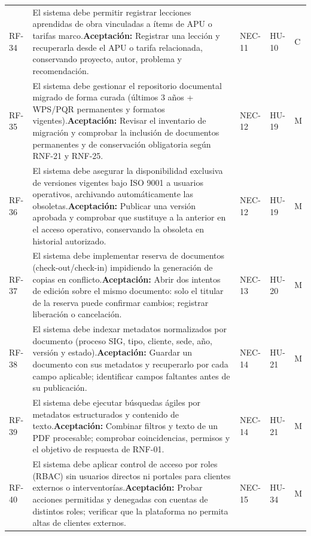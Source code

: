 \documentclass[12pt,letterpaper]{article}
\begin{document}
{\begin{longtable}{@{}L{1.6cm}L{8.05cm}L{2.0cm}L{1.5cm}L{1.2cm}@{}}
RF-34 & El sistema debe permitir registrar lecciones aprendidas de obra vinculadas a ítems de APU o tarifas marco.\newline \textbf{Aceptación:} Registrar una lección y recuperarla desde el APU o tarifa relacionada, conservando proyecto, autor, problema y recomendación. & NEC-11 & HU-10 & C\\
RF-35 & El sistema debe gestionar el repositorio documental migrado de forma curada (últimos 3 años + WPS/PQR permanentes y formatos vigentes).\newline \textbf{Aceptación:} Revisar el inventario de migración y comprobar la inclusión de documentos permanentes y de conservación obligatoria según RNF-21 y RNF-25. & NEC-12 & HU-19 & M\\
RF-36 & El sistema debe asegurar la disponibilidad exclusiva de versiones vigentes bajo ISO 9001 a usuarios operativos, archivando automáticamente las obsoletas.\newline \textbf{Aceptación:} Publicar una versión aprobada y comprobar que sustituye a la anterior en el acceso operativo, conservando la obsoleta en historial autorizado. & NEC-12 & HU-19 & M\\
RF-37 & El sistema debe implementar reserva de documentos (check-out/check-in) impidiendo la generación de copias en conflicto.\newline \textbf{Aceptación:} Abrir dos intentos de edición sobre el mismo documento: solo el titular de la reserva puede confirmar cambios; registrar liberación o cancelación. & NEC-13 & HU-20 & M\\
RF-38 & El sistema debe indexar metadatos normalizados por documento (proceso SIG, tipo, cliente, sede, año, versión y estado).\newline \textbf{Aceptación:} Guardar un documento con sus metadatos y recuperarlo por cada campo aplicable; identificar campos faltantes antes de su publicación. & NEC-14 & HU-21 & M\\
RF-39 & El sistema debe ejecutar búsquedas ágiles por metadatos estructurados y contenido de texto.\newline \textbf{Aceptación:} Combinar filtros y texto de un PDF procesable; comprobar coincidencias, permisos y el objetivo de respuesta de RNF-01. & NEC-14 & HU-21 & M\\
RF-40 & El sistema debe aplicar control de acceso por roles (RBAC) sin usuarios directos ni portales para clientes externos o interventorías.\newline \textbf{Aceptación:} Probar acciones permitidas y denegadas con cuentas de distintos roles; verificar que la plataforma no permita altas de clientes externos. & NEC-15 & HU-34 & M\\

\end{longtable}}
\end{document}
